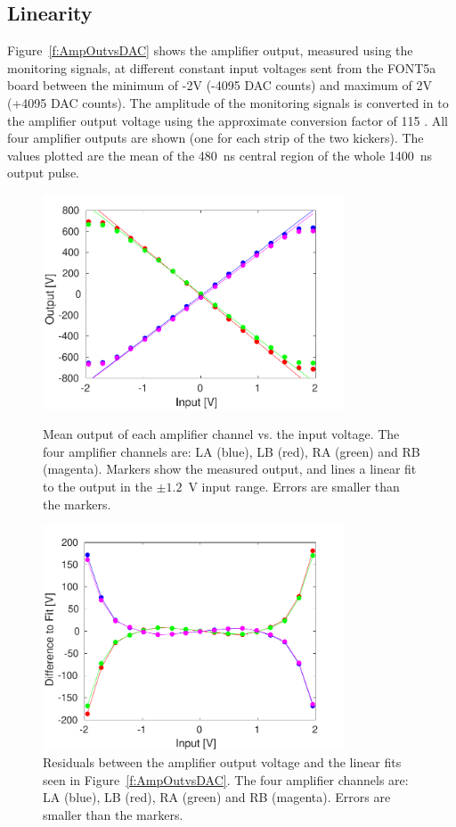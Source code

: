 \subsection{Linearity}
\label{ss:ampLin}

Figure~\ref{f:AmpOutvsDAC} shows the amplifier output, measured using the monitoring signals, at different constant input voltages sent from the FONT5a board between the minimum of -2V (-4095 DAC counts) and maximum of 2V (+4095 DAC counts). The amplitude of the monitoring signals is converted in to the amplifier output voltage using the approximate conversion factor of 115 \cite{colinPriv}. All four amplifier outputs are shown (one for each strip of the two kickers). The values plotted are the mean of the 480~ns central region of the whole 1400~ns output pulse.

\begin{figure}
  \centering
  \includegraphics[width=0.8\textwidth]{Figures/commissioning/AmpOutvsDAC}
  \caption{Mean output of each amplifier channel vs. the input voltage. The four amplifier channels are: LA (blue), LB (red), RA (green) and RB (magenta). Markers show the measured output, and lines a linear fit to the output in the \(\pm1.2\)~V input range. Errors are smaller than the markers.}
  \label{f:AmpOutvsDAC}
  \includegraphics[width=0.8\textwidth]{Figures/commissioning/AmpOutvsDAC_residual}
  \caption{Residuals between the amplifier output voltage and the linear fits seen in Figure~\ref{f:AmpOutvsDAC}. The four amplifier channels are: LA (blue), LB (red), RA (green) and RB (magenta). Errors are smaller than the markers. }
  \label{f:AmpOutvsDAC_residual}
\end{figure}

